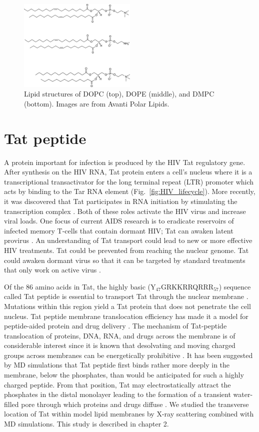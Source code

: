 \begin{figure}[htbp]
  \centering
  \includegraphics[width=0.5\textwidth]{figures/lipid_structure}
  \caption{Lipid structures of DOPC (top), DOPE (middle),
  and DMPC (bottom). Images are from Avanti Polar Lipids.}
  \label{fig:lipid_structure}
\end{figure}

\section{Tat peptide}\label{sec:Tat_peptide}
A protein important for infection is produced by the HIV Tat regulatory gene.
After synthesis on the HIV RNA, Tat protein enters a cell's nucleus where it is a
transcriptional transactivator for the long terminal repeat (LTR)
promoter which acts by binding to the Tar RNA element \cite{Vaishnav91}
(Fig.~\ref{fig:HIV_lifecycle}).
More recently, it was discovered that Tat participates in RNA
initiation by stimulating the transcription complex \cite{Raha05}.
Both of these roles activate the HIV virus and increase viral loads.
One focus of current AIDS research is to eradicate reservoirs of 
infected memory T-cells that contain dormant HIV;
Tat can awaken latent provirus \cite{Macias09}.
An understanding of Tat transport could lead to new or more effective 
HIV treatments. Tat could be prevented from
reaching the nuclear genome. Tat could awaken dormant virus so that
it can be targeted by standard treatments that only
work on active virus \cite{Macias09}. 

Of the 86 amino acids in Tat,
the highly basic (Y$_{47}$GRKKRRQRRR$_{57}$) sequence called Tat peptide 
is essential to transport
Tat through the nuclear membrane \cite{Ruben89,Hauber87}. 
Mutations within
this region yield a Tat protein that does not penetrate the cell 
nucleus. Tat peptide membrane translocation efficiency 
has made it a model for peptide-aided protein and drug delivery
\cite{Futaki01}. 
The mechanism of Tat-peptide translocation of proteins, 
DNA, RNA, and drugs across the membrane is of considerable interest
since it is known that desolvating and moving charged groups across membranes
can be energetically prohibitive \cite{Grabe04}. 
It has been suggested by MD simulations that Tat peptide first binds rather
more deeply in the membrane, below the phosphates, than
would be anticipated for such a highly charged peptide. From that position,
Tat may electrostatically attract the phosphates in the distal monolayer
leading to the formation of a transient water-filled pore through which
proteins and drugs diffuse \cite{Herce07}. 
We studied the transverse location of Tat within model lipid membranes 
by X-ray scattering
combined with MD simulations. This study is described in chapter 2.

